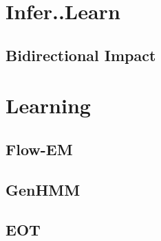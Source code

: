 \section{Infer..Learn}
\subsection{Bidirectional Impact}


\section{Learning}

\subsection{Flow-EM}

\subsection{GenHMM}


\subsection{EOT}



